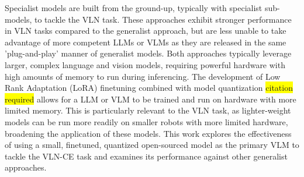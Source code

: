 \documentclass{svproc}
\begin{document}
    \par
    Specialist models \cite{hong2021_vlnbert, navgpt2, chen2021_HAMT, HE2024110511_MemoryAdaptiveVLN} are built from the ground-up, typically with specialist sub-models, to tackle the VLN task. These approaches exhibit stronger performance in VLN tasks compared to the generalist approach, but are less unable to take advantage of more competent LLMs or VLMs as they are released in the same 'plug-and-play' manner of generalist models.
    \newline
    Both approaches typically leverage larger, complex language and vision models, requiring powerful hardware with high amounts of memory to run during inferencing. The development of Low Rank Adaptation (LoRA) finetuning \cite{LoRA} combined with model quantization \colorbox{yellow}{citation required} allows for a LLM or VLM to be trained and run on hardware with more limited memory. This is particularly relevant to the VLN task, as lighter-weight models can be run more readily on smaller robots with more limited hardware, broadening the application of these models.
    \newline
    This work explores the effectiveness of using a small, finetuned, quantized open-sourced model as the primary VLM to tackle the VLN-CE task and examines its performance against other generalist approaches. 
    
\end{document}
